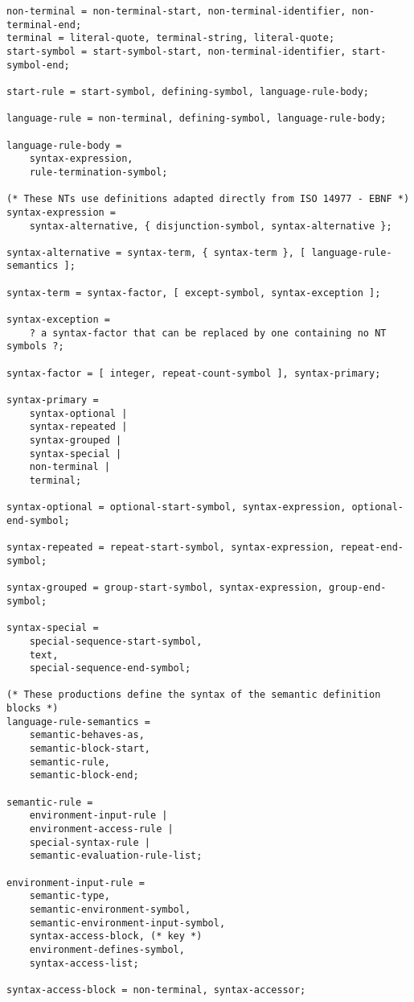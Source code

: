 \begin{verbatim}
non-terminal = non-terminal-start, non-terminal-identifier, non-terminal-end;
terminal = literal-quote, terminal-string, literal-quote;
start-symbol = start-symbol-start, non-terminal-identifier, start-symbol-end;

start-rule = start-symbol, defining-symbol, language-rule-body;

language-rule = non-terminal, defining-symbol, language-rule-body;

language-rule-body = 
    syntax-expression,
    rule-termination-symbol;

(* These NTs use definitions adapted directly from ISO 14977 - EBNF *)
syntax-expression = 
    syntax-alternative, { disjunction-symbol, syntax-alternative };

syntax-alternative = syntax-term, { syntax-term }, [ language-rule-semantics ];

syntax-term = syntax-factor, [ except-symbol, syntax-exception ];

syntax-exception = 
    ? a syntax-factor that can be replaced by one containing no NT symbols ?;

syntax-factor = [ integer, repeat-count-symbol ], syntax-primary;

syntax-primary = 
    syntax-optional | 
    syntax-repeated |
    syntax-grouped |
    syntax-special |
    non-terminal |
    terminal;

syntax-optional = optional-start-symbol, syntax-expression, optional-end-symbol;

syntax-repeated = repeat-start-symbol, syntax-expression, repeat-end-symbol;

syntax-grouped = group-start-symbol, syntax-expression, group-end-symbol;

syntax-special =
    special-sequence-start-symbol,
    text,
    special-sequence-end-symbol;

(* These productions define the syntax of the semantic definition blocks *)
language-rule-semantics = 
    semantic-behaves-as,
    semantic-block-start,
    semantic-rule,
    semantic-block-end;

semantic-rule = 
    environment-input-rule |
    environment-access-rule |
    special-syntax-rule |
    semantic-evaluation-rule-list;

environment-input-rule =
    semantic-type, 
    semantic-environment-symbol,
    semantic-environment-input-symbol,
    syntax-access-block, (* key *)
    environment-defines-symbol,
    syntax-access-list;

syntax-access-block = non-terminal, syntax-accessor;


\end{verbatim}
